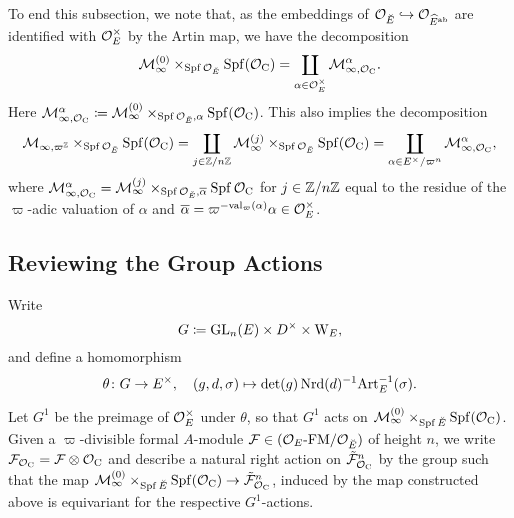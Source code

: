 \documentclass[../main.tex]{subfiles}
\begin{document}
To end this subsection, we note that, as the embeddings of 
$\mathcal{O}_{\breve {E}} \hookrightarrow \mathcal{O}_{\widehat E^{\mathrm{ab}}}$ are identified with $\mathcal{O}_E^\times$ by
the Artin map, we have the decomposition
\begin{equation}\label{eq:decompofcMinftyZEROtensorwithOCp}
  \mathcal{M}_{\infty}^{(0)} \times_{\operatorname{Spf} \mathcal{O}_{\breve {E}}} \operatorname{Spf}(\mathcal{O}_{\mathrm{C}})
  = \coprod_{\alpha \in \mathcal{O}_E^\times} \mathcal{M}_{\infty, \mathcal{O}_{\mathrm{C}}}^\alpha.
\end{equation}
Here $\mathcal{M}_{\infty, \mathcal{O}_{\mathrm{C}}}^\alpha \coloneqq \mathcal{M}_{\infty}^{(0)} \times_{\operatorname{Spf} \mathcal{O}_{\breve {E}},
\alpha} \operatorname{Spf}(\mathcal{O}_{\mathrm{C}})$.
This also implies the decomposition 
\begin{equation}\label{eq:decompOfMInftyQuotTensorWithOCp}
  \mathcal{M}_{\infty, \varpi^{\mathbb{Z}}} \times_{\operatorname{Spf} \mathcal{O}_{\breve {E}}} \operatorname{Spf} (\mathcal{O}_{\mathrm{C}}) = 
  \coprod_{j \in \mathbb{Z}/n\mathbb{Z}} \mathcal{M}_{\infty}^{(j)}\times_{\operatorname{Spf} \mathcal{O}_{\breve {E}}} \operatorname{Spf}(\mathcal{O}_{\mathrm{C}})
  = \coprod_{\alpha \in E^\times/\varpi^n} \mathcal{M}_{\infty, \mathcal{O}_{\mathrm{C}}}^{\alpha},
\end{equation}
where $\mathcal{M}_{\infty, \mathcal{O}_{\mathrm{C}}}^\alpha = \mathcal{M}_{\infty}^{(j)} \times_{\operatorname{Spf} \mathcal{O}_{\breve {E}},
\overline \alpha} \operatorname{Spf} \mathcal{O}_{\mathrm{C}}$ for $j \in \mathbb{Z}/n\mathbb{Z}$ equal to the residue of the
$\varpi$-adic valuation of $\alpha$ and $\overline \alpha =
\varpi^{-\mathrm{val}_\varpi(\alpha)}\alpha \in \mathcal{O}_E^\times$.


\subsection{Reviewing the Group Actions} %
\label{ssub:Group Actions on the Universal Cover}
Write
\begin{equation*}
  G \coloneqq \operatorname{GL}_n(E) \times D^\times \times \mathrm W_E,
\end{equation*}
and define a homomorphism
\begin{equation*}
  \theta \colon G \to E^\times, \quad (g,d,\sigma) \mapsto \det(g) \operatorname{Nrd}(d)^{-1}
  \mathrm{Art}^{-1}_E(\sigma).
\end{equation*}

Let $G^1$ be the preimage of $\mathcal{O}_E^\times$ under $\theta$, so that 
$G^1$ acts on $\mathcal{M}_{\infty}^{(0)} \times_{\operatorname{Spf} {\breve {E}}} \operatorname{Spf}(\mathcal{O}_{\mathrm{C}})$. 
Given a $\varpi$-divisible formal $A$-module $\mathcal{F} \in {({\mathcal{O}_E}\text-\allowbreak\mathrm{FM}/{\mathcal{O}_{{\breve {E}}}})}$ of height
$n$, we write $\mathcal{F}_{\mathcal{O}_{\mathrm{C}}} = \mathcal{F} \otimes \mathcal{O}_{\mathrm{C}}$ and describe a natural right
action on $\tilde {\mathcal{F}}_{\mathcal{O}_{\mathrm{C}}}^n$ by the group 
such that the map $\mathcal{M}_{\infty}^{(0)} \times_{\operatorname{Spf} {\breve {E}}} \operatorname{Spf}(\mathcal{O}_{\mathrm{C}}) \to
\tilde {\mathcal{F}}_{\mathcal{O}_{\mathrm{C}}}^n$,
induced by the map constructed above is equivariant for the respective
$G^1$-actions.
\end{document}
